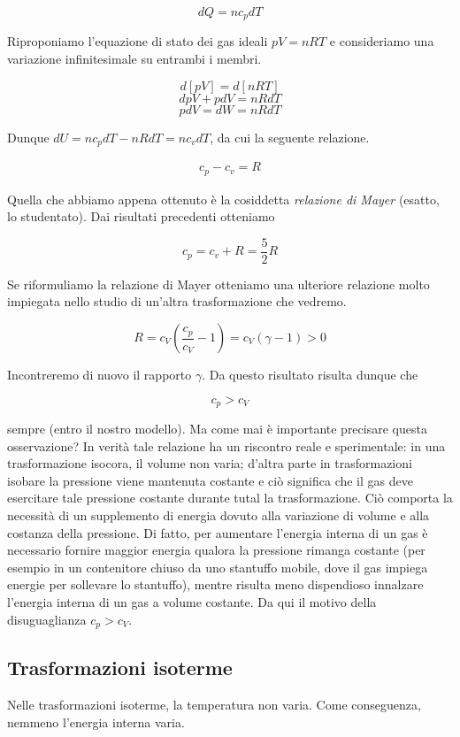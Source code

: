 \[ dQ = nc_pdT \]

\noindent Riproponiamo l'equazione di stato dei gas ideali $pV = nRT$ e
consideriamo una variazione infinitesimale su entrambi i membri.

\[ d[pV] = d[nRT] \]
\[ dpV + pdV = nRdT \]
\[ pdV = dW = nRdT \]

\noindent Dunque $dU = nc_pdT - nRdT = nc_vdT$, da cui la seguente relazione.

\begin{align}
    c_p - c_v = R
\end{align}

\noindent Quella che abbiamo appena ottenuto è la cosiddetta \textit{relazione
di Mayer} (esatto, lo studentato). Dai risultati precedenti otteniamo

\[ c_p = c_v + R = \frac52R \]

Se riformuliamo la relazione di Mayer otteniamo una ulteriore relazione
molto impiegata nello studio di un'altra trasformazione che vedremo.

\[ R = c_V\left(\frac{c_p}{c_V} - 1\right) = c_V(\gamma - 1) > 0 \]

\noindent Incontreremo di nuovo il rapporto $\gamma$. Da questo risultato
risulta dunque che

\[ c_p > c_V \]

\noindent sempre (entro il nostro modello). Ma come mai è importante precisare
questa osservazione? In verità tale relazione ha un riscontro reale
e sperimentale: in una trasformazione isocora, il volume non varia;
d'altra parte in trasformazioni isobare la pressione viene mantenuta
costante e ciò significa che il gas deve esercitare tale pressione
costante durante tutal la trasformazione. Ciò comporta la necessità di un
supplemento di energia dovuto alla variazione di volume e alla costanza
della pressione. Di fatto, per aumentare l'energia interna di un
gas è necessario fornire maggior energia qualora la pressione rimanga
costante (per esempio in un contenitore chiuso da uno stantuffo mobile,
dove il gas impiega energie per sollevare lo stantuffo), mentre risulta
meno dispendioso innalzare l'energia interna di un gas a volume
costante. Da qui il motivo della disuguaglianza $c_p > c_V$.

\subsection*{Trasformazioni isoterme}
Nelle trasformazioni isoterme, la temperatura non varia. Come
conseguenza, nemmeno l'energia interna varia.


